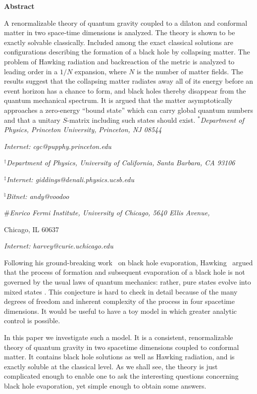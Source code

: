 \bigskip
\centerline{\bf Abstract}
A renormalizable theory of quantum gravity coupled to a dilaton and
conformal matter in two space-time dimensions is analyzed. The theory is
shown to be exactly solvable classically.  Included among the exact
classical solutions are configurations describing the formation of a black
hole by collapsing matter.  The problem of Hawking radiation and
backreaction of the metric is analyzed to leading order in a $1/N$
expansion, where $N$ is the number of matter fields. The results suggest
that the collapsing matter radiates away all of its energy before an event
horizon has a chance to form, and black holes thereby disappear from the
quantum mechanical spectrum. It is argued that the matter asymptotically
approaches a zero-energy ``bound state'' which can carry global quantum
numbers and that a unitary $S$-matrix including such states should exist.
\bigskip
\bigskip
\medskip
{\sl $^*$Department of Physics, Princeton University,} {\sl Princeton, NJ
08544}

{\it Internet: cgc@pupphy.princeton.edu}

{\sl$^\dagger$Department of
Physics, University of California,} {\sl Santa Barbara, CA 93106}

{\it
$^\ddagger$Internet: giddings@denali.physics.ucsb.edu}

{\it
$^\natural$Bitnet: andy@voodoo}

{$\#$\sl Enrico Fermi Institute, University of Chicago, 5640 Ellis Avenue,

Chicago, IL 60637 }
{\it Internet: harvey@curie.uchicago.edu}


Following his ground-breaking work \Hawk\ on black hole evaporation,
Hawking \unpred\ argued that the process of formation and subsequent
evaporation of a black hole is not governed by the usual laws of quantum
mechanics: rather, pure states evolve into mixed states \Waldrev.  This
conjecture is hard to check in detail because of the many degrees of
freedom and inherent complexity of the process in four spacetime
dimensions. It would be useful to have a toy model in which greater
analytic control is possible.

In this paper we investigate such a model. It is a consistent,
renormalizable theory of quantum gravity in two spacetime dimensions
coupled to conformal matter. It contains black hole solutions as well as
Hawking radiation, and is exactly soluble at the classical level.  As we
shall see, the theory is just complicated enough to enable one to ask the
interesting questions concerning black hole evaporation, yet simple enough
to obtain some answers.

